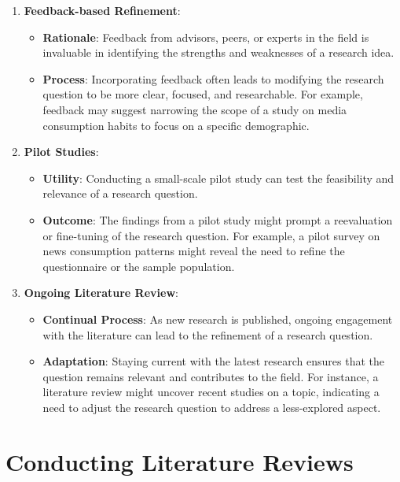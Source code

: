 \documentclass[
]{book}
\providecommand{\tightlist}{%
  \setlength{\itemsep}{0pt}\setlength{\parskip}{0pt}}
\begin{document}
\begin{enumerate}
\def\labelenumi{\arabic{enumi}.}
\tightlist
\item
  \textbf{Feedback-based Refinement}:

  \begin{itemize}
  \tightlist
  \item
    \textbf{Rationale}: Feedback from advisors, peers, or experts in the field is invaluable in identifying the strengths and weaknesses of a research idea.
  \item
    \textbf{Process}: Incorporating feedback often leads to modifying the research question to be more clear, focused, and researchable. For example, feedback may suggest narrowing the scope of a study on media consumption habits to focus on a specific demographic.
  \end{itemize}
\item
  \textbf{Pilot Studies}:

  \begin{itemize}
  \tightlist
  \item
    \textbf{Utility}: Conducting a small-scale pilot study can test the feasibility and relevance of a research question.
  \item
    \textbf{Outcome}: The findings from a pilot study might prompt a reevaluation or fine-tuning of the research question. For example, a pilot survey on news consumption patterns might reveal the need to refine the questionnaire or the sample population.
  \end{itemize}
\item
  \textbf{Ongoing Literature Review}:

  \begin{itemize}
  \tightlist
  \item
    \textbf{Continual Process}: As new research is published, ongoing engagement with the literature can lead to the refinement of a research question.
  \item
    \textbf{Adaptation}: Staying current with the latest research ensures that the question remains relevant and contributes to the field. For instance, a literature review might uncover recent studies on a topic, indicating a need to adjust the research question to address a less-explored aspect.
  \end{itemize}
\end{enumerate}

\hypertarget{conducting-literature-reviews}{%
\chapter{Conducting Literature Reviews}\label{conducting-literature-reviews}}
\end{document}
